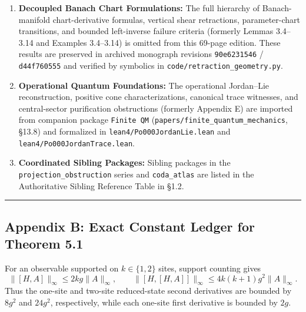 \documentclass[
  11pt,
]{article}
\providecommand{\tightlist}{%
  \setlength{\itemsep}{0pt}\setlength{\parskip}{0pt}}
\providecommand{\tightlist}{%
  \setlength{\itemsep}{0pt}\setlength{\parskip}{0pt}}
\begin{document}
\begin{enumerate}
\def\labelenumi{\arabic{enumi}.}
\tightlist
\item
  \textbf{Decoupled Banach Chart Formulations:} The full hierarchy of Banach-manifold chart-derivative formulas, vertical shear retractions, parameter-chart transitions, and bounded left-inverse failure criteria (formerly Lemmas 3.4--3.14 and Examples 3.4--3.14) is omitted from this 69-page edition. These results are preserved in archived monograph revisions \texttt{90e6231546} / \texttt{d44f760555} and verified by symbolics in \texttt{code/retraction\_geometry.py}.
\item
  \textbf{Operational Quantum Foundations:} The operational Jordan--Lie reconstruction, positive cone characterizations, canonical trace witnesses, and central-sector purification obstructions (formerly Appendix E) are imported from companion package \texttt{Finite\ QM} (\texttt{papers/finite\_quantum\_mechanics}, §13.8) and formalized in \texttt{lean4/Po000JordanLie.lean} and \texttt{lean4/Po000JordanTrace.lean}.
\item
  \textbf{Coordinated Sibling Packages:} Sibling packages in the \texttt{projection\_obstruction} series and \texttt{coda\_atlas} are listed in the Authoritative Sibling Reference Table in §1.2.
\end{enumerate}

\begin{center}\rule{0.5\linewidth}{0.5pt}\end{center}

\subsection{Appendix B: Exact Constant Ledger for Theorem 5.1}\label{appendix-b-exact-constant-ledger-for-theorem-5.1}

For an observable supported on \(k\in\{1,2\}\) sites, support counting gives
\[
\lVert[H,A]\rVert_\infty\le2kg\lVert A\rVert_\infty,
\qquad
\lVert[H,[H,A]]\rVert_\infty
\le4k(k+1)g^2\lVert A\rVert_\infty.
\]
Thus the one-site and two-site reduced-state second derivatives are bounded by \(8g^2\) and \(24g^2\), respectively, while each one-site first derivative is bounded by \(2g\).
\end{document}
